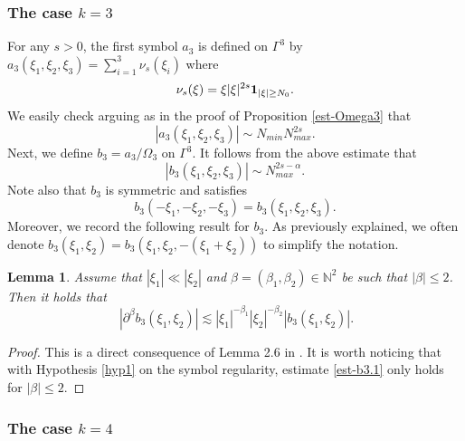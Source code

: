 \documentclass{amsart}
\newtheorem{lemma}[theorem]{Lemma}
\theoremstyle{definition}
\theoremstyle{remark}
\newcommand{\N}{\mathbb{N}}
\numberwithin{equation}{section}
\begin{document}
\subsubsection{The case $k=3$}
For any $s>0$, the first symbol $a_3$ is defined on $\Gamma^3$ by $a_3(\xi_1,\xi_2,\xi_3) = \sum_{i=1}^3 \nu_s(\xi_i)$ where
$$
\nu_s(\xi) = \xi|\xi|^{2s}{ \bf 1}_{|\xi|\ge N_0}.
$$
We easily check arguing as in the proof of Proposition \ref{est-Omega3} that 
$$
|a_3(\xi_1,\xi_2,\xi_3)| \sim N_{min} N_{max}^{2s}.
$$
Next, we define $b_3 = a_3/\Omega_3$ on $\Gamma^3$. It follows from the above estimate that
\begin{equation}\label{est-b3}
|b_3(\xi_1,\xi_2,\xi_3)| \sim  N_{max}^{2s-\alpha}.
\end{equation}
Note also that $b_3$ is symmetric and satisfies
$$
b_3(-\xi_1,-\xi_2,-\xi_3) = b_3(\xi_1,\xi_2,\xi_3).
$$
Moreover, we record the following result for $b_3$. As previously explained, we often denote $b_3(\xi_1,\xi_2)=b_3(\xi_1,\xi_2,-(\xi_1+\xi_2))$ to simplify the notation. 
\begin{lemma}
  Assume that $|\xi_1|\ll |\xi_2|$ and $\beta=(\beta_1,\beta_2)\in\N^2$ be such that $|\beta|\le 2$. Then it holds that
  \begin{equation}\label{est-b3.1}
 \ |\partial^\beta b_3(\xi_1,\xi_2)|\lesssim |\xi_1|^{-\beta_1} |\xi_2|^{-\beta_2} |b_3(\xi_1,\xi_2)|.
\end{equation}
\end{lemma}
\begin{proof}
  This is a direct consequence of Lemma 2.6 in \cite{MPV}. It is worth noticing that with Hypothesis \ref{hyp1} on the symbol regularity, estimate \eqref{est-b3.1} only holds for $|\beta|\le 2$.
\end{proof}


\subsubsection{The case $k=4$}
\end{document}
